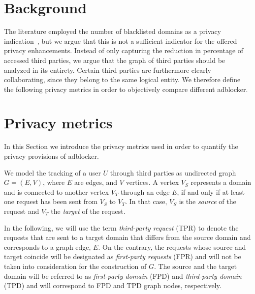 \documentclass{sig-alternate}
\begin{document}
\section{Background} \label{sec:background}
The literature employed the number of blacklisted domains as a privacy indication~\cite{XX}, but we argue that this is not a sufficient indicator for the offered privacy enhancements. Instead of only capturing the reduction in percentage of accessed third parties, we argue that the graph of third parties should be analyzed in its entirety. Certain third parties are furthermore clearly collaborating, since they belong to the same logical entity. We therefore define the following privacy metrics in order to objectively compare different adblocker.

\section{Privacy metrics} \label{sec:privacy_metrics}
In this Section we introduce the privacy metrics used in order to quantify the privacy provisions of adblocker.


We model the tracking of a user $U$ through third parties as undirected graph $G=(E,V)$, where $E$ are edges, and $V$ vertices. A vertex $V_S$ represents a domain and is connected to another vertex $V_T$ through an edge $E$, if and only if at least one request has been sent from $V_S$ to $V_T$. In that case, $V_S$ is the \textit{source} of the request and $V_T$ the \textit{target} of the request.

In the following, we will use the term \textit{third-party request} (TPR) to denote the requests that are sent to a target domain that differs from the source domain and corresponds to a graph edge, $E$. On the contrary, the requests whose source and target coincide will be designated as \textit{first-party requests} (FPR) and will not be taken into consideration for the construction of $G$. The source and the target domain will be referred to as \textit{first-party domain} (FPD) and \textit{third-party domain} (TPD) and will correspond to FPD and TPD graph nodes, respectively.
\end{document}
